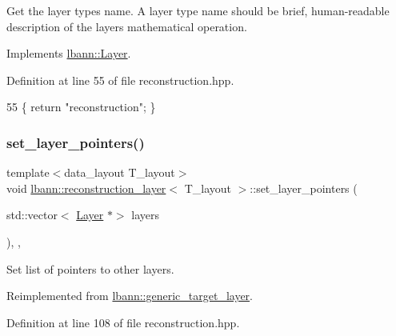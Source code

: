 Get the layer type\textquotesingle{}s name. A layer type name should be brief, human-\/readable description of the layer\textquotesingle{}s mathematical operation. 

Implements \hyperlink{classlbann_1_1Layer_a0fa0ea9160b490c151c0a17fde4f7239}{lbann\+::\+Layer}.



Definition at line 55 of file reconstruction.\+hpp.


\begin{DoxyCode}
55 \{ \textcolor{keywordflow}{return} \textcolor{stringliteral}{"reconstruction"}; \}
\end{DoxyCode}
\mbox{\label{classlbann_1_1reconstruction__layer_a663b2810780ee2b0817f611a00b0b07f}} 
\subsubsection{\texorpdfstring{set\+\_\+layer\+\_\+pointers()}{set\_layer\_pointers()}}
{\footnotesize\ttfamily template$<$data\+\_\+layout T\+\_\+layout$>$ \\
void \hyperlink{classlbann_1_1reconstruction__layer}{lbann\+::reconstruction\+\_\+layer}$<$ T\+\_\+layout $>$\+::set\+\_\+layer\+\_\+pointers (\begin{DoxyParamCaption}\item[{std\+::vector$<$ \hyperlink{classlbann_1_1Layer}{Layer} $\ast$$>$}]{layers }\end{DoxyParamCaption})\hspace{0.3cm}{\ttfamily [inline]}, {\ttfamily [override]}, {\ttfamily [virtual]}}

Set list of pointers to other layers. 

Reimplemented from \hyperlink{classlbann_1_1generic__target__layer_a1f8f722fadb1223b063c0917afd83b66}{lbann\+::generic\+\_\+target\+\_\+layer}.



Definition at line 108 of file reconstruction.\+hpp.


